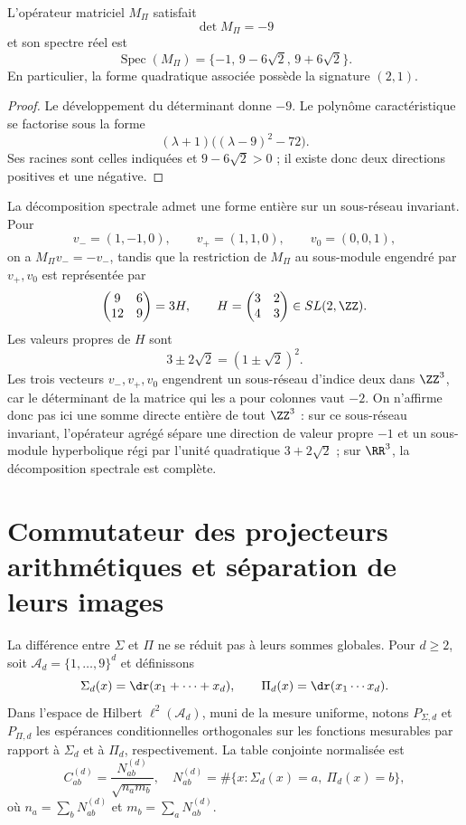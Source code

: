 \begin{theorem}
\label{thm:app-espectro-agregado}
L'opérateur matriciel \(M_\Pi\) satisfait
\[
 \det M_\Pi=-9
\]
et son spectre réel est
\[
 \operatorname{Spec}(M_\Pi)
 =\{-1,\,9-6\sqrt2,\,9+6\sqrt2\}.
\]
En particulier, la forme quadratique associée possède la signature \((2,1)\).
\end{theorem}

\begin{proof}
Le développement du déterminant donne \(-9\). Le polynôme caractéristique
se factorise sous la forme
\[
 (\lambda+1)\bigl((\lambda-9)^2-72\bigr).
\]
Ses racines sont celles indiquées et \(9-6\sqrt2>0\) ; il existe donc deux
directions positives et une négative.
\end{proof}

La décomposition spectrale admet une forme entière sur un sous-réseau
invariant. Pour
\[
 v_-=(1,-1,0),\qquad v_+=(1,1,0),\qquad v_0=(0,0,1),
\]
on a \(M_\Pi v_-=-v_-\), tandis que la restriction de \(M_\Pi\) au
sous-module engendré par \(v_+,v_0\) est représentée par
\[
 \begin{pmatrix}9&6\\12&9\end{pmatrix}
 =3H,\qquad
 H=\begin{pmatrix}3&2\\4&3\end{pmatrix}\in SL(2,\ZZ).
\]
Les valeurs propres de \(H\) sont
\[
 3\pm2\sqrt2=(1\pm\sqrt2)^2.
\]
Les trois vecteurs \(v_-,v_+,v_0\) engendrent un sous-réseau d'indice deux dans
\(\ZZ^3\), car le déterminant de la matrice qui les a pour colonnes vaut
\(-2\). On n'affirme donc pas ici une somme directe entière de tout
\(\ZZ^3\) : sur ce sous-réseau invariant, l'opérateur agrégé sépare une
direction de valeur propre \(-1\) et un sous-module hyperbolique régi par
l'unité quadratique \(3+2\sqrt2\) ; sur \(\RR^3\), la décomposition spectrale
est complète.

\section{Commutateur des projecteurs arithmétiques et séparation de leurs images}

La différence entre \(\Sigma\) et \(\Pi\) ne se réduit pas à leurs sommes globales.
Pour \(d\ge2\), soit \(\mathscr A_d=\{1,\ldots,9\}^d\) et définissons
\[
 \Sigma_d(x)=\dr(x_1+\cdots+x_d),\qquad
 \Pi_d(x)=\dr(x_1\cdots x_d).
\]
Dans l'espace de Hilbert \(\ell^2(\mathscr A_d)\), muni de la mesure
uniforme, notons \(P_{\Sigma,d}\) et \(P_{\Pi,d}\) les espérances
conditionnelles orthogonales sur les fonctions mesurables par rapport à
\(\Sigma_d\) et à \(\Pi_d\), respectivement. La table conjointe normalisée est
\[
 C^{(d)}_{ab}
 =\frac{N^{(d)}_{ab}}{\sqrt{n_a m_b}},
\quad
 N^{(d)}_{ab}
 =\#\{x:\Sigma_d(x)=a,\ \Pi_d(x)=b\},
\]
où \(n_a=\sum_bN^{(d)}_{ab}\) et \(m_b=\sum_aN^{(d)}_{ab}\).

